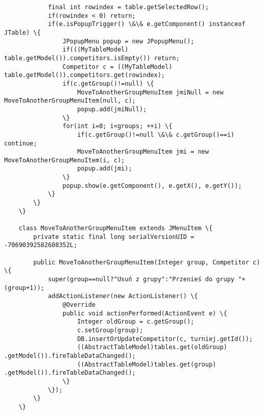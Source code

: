 \begin{verbatim}
            final int rowindex = table.getSelectedRow();
            if(rowindex < 0) return;
            if(e.isPopupTrigger() \&\& e.getComponent() instanceof JTable) \{
                JPopupMenu popup = new JPopupMenu();
                if(((MyTableModel) table.getModel()).competitors.isEmpty()) return;
                Competitor c = ((MyTableModel) table.getModel()).competitors.get(rowindex);
                if(c.getGroup()!=null) \{
                	MoveToAnotherGroupMenuItem jmiNull = new MoveToAnotherGroupMenuItem(null, c);
                	popup.add(jmiNull);
                \}
                for(int i=0; i<groups; ++i) \{
                	if(c.getGroup()!=null \&\& c.getGroup()==i) continue;
                	MoveToAnotherGroupMenuItem jmi = new MoveToAnotherGroupMenuItem(i, c);
                    popup.add(jmi);
                \}
                popup.show(e.getComponent(), e.getX(), e.getY());
            \}
        \}
	\}
	
	class MoveToAnotherGroupMenuItem extends JMenuItem \{
		private static final long serialVersionUID = -70690392582608352L;

		public MoveToAnotherGroupMenuItem(Integer group, Competitor c) \{
			super(group==null?"Usuń z grupy":"Przenieś do grupy "+(group+1));
			addActionListener(new ActionListener() \{
				@Override
				public void actionPerformed(ActionEvent e) \{
					Integer oldGroup = c.getGroup();
					c.setGroup(group);
					DB.insertOrUpdateCompetitor(c, turniej.getId());
					((AbstractTableModel)tables.get(oldGroup)	.getModel()).fireTableDataChanged();
					((AbstractTableModel)tables.get(group)		.getModel()).fireTableDataChanged();
				\}
			\});
		\}
	\}
\end{verbatim}

